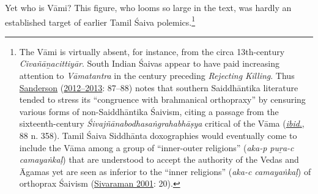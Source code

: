 Yet who is Vāmi? This figure, who looms so large in the text, was hardly an established target of earlier Tamil Śaiva polemics.\footnote{%
The Vāmi is virtually absent, for instance, from the circa 13th-century \emph{{Civañāṉacittiyār}}. South Indian Śaivas appear to have paid increasing attention to \emph{{Vāmatantra}} in the century preceding \emph{Rejecting Killing}. Thus \hyperref[Sanderson20122013]{Sanderson} (\hyperref[Sanderson20122013]{2012–2013}: 87–88) notes that southern Saiddhāntika literature tended to stress its “congruence with brahmanical orthopraxy” by censuring various forms of non-Saiddhāntika Śaivism, citing a passage from the sixteenth-century \emph{{Śivajñānabodhasaṅgrahabhāṣya}} critical of the Vāma (\hyperref[Sanderson20122013]{\emph{ibid}.}, 88 n. 358). Tamil Śaiva Siddhānta doxographies would eventually come to include the Vāma among a group of “inner-outer religions” (\emph{aka-p puṟa-c camayaṅkaḷ}) that are understood to accept the authority of the Vedas and Āgamas yet are seen as inferior to the “inner religions” (\emph{aka-c camayaṅkaḷ}) of orthoprax Śaivism (\hyperref[Sivaraman2001]{Sivaraman 2001}: 20).
}
